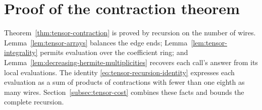 \section{Proof of the contraction theorem}
\label{app:tensor}

Theorem~\ref{thm:tensor-contraction} is proved by recursion on the
number of wires. Lemma~\ref{lem:tensor-arrays} balances the edge ends;
Lemma~\ref{lem:tensor-integrality} permits evaluation over the coefficient
ring; and Lemma~\ref{lem:decreasing-hermite-multiplicities} recovers each call's answer
from its local evaluations. The identity
\eqref{eq:tensor-recursion-identity} expresses each evaluation as a sum
of products of contractions with fewer than one eighth as many wires.
Section~\ref{subsec:tensor-cost} combines these facts and bounds the
complete recursion.

